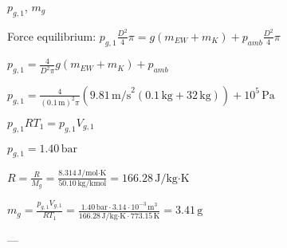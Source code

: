 \( p_{g,1} \), \( m_g \)  

Force equilibrium:  
\( p_{g,1} \frac{D^2}{4} \pi = g (m_{EW} + m_K) + p_{amb} \frac{D^2}{4} \pi \)  

\( p_{g,1} = \frac{4}{D^2 \pi} g (m_{EW} + m_K) + p_{amb} \)  

\( p_{g,1} = \frac{4}{(0.1 \, \text{m})^2 \pi} (9.81 \, \text{m/s}^2 (0.1 \, \text{kg} + 32 \, \text{kg})) + 10^5 \, \text{Pa} \)  

\( p_{g,1} R T_1 = p_{g,1} V_{g,1} \)  

\( p_{g,1} = 1.40 \, \text{bar} \)  

\( R = \frac{R}{M_g} = \frac{8.314 \, \text{J/mol·K}}{50.10 \, \text{kg/kmol}} = 166.28 \, \text{J/kg·K} \)  

\( m_g = \frac{p_{g,1} V_{g,1}}{R T_1} = \frac{1.40 \, \text{bar} \cdot 3.14 \cdot 10^{-3} \, \text{m}^3}{166.28 \, \text{J/kg·K} \cdot 773.15 \, \text{K}} = 3.41 \, \text{g} \)  

---